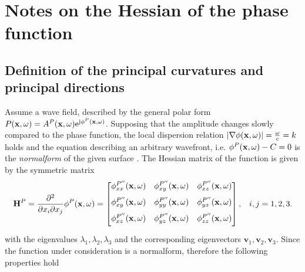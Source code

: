 \section{Notes on the Hessian of the phase function}
\label{App:Hessian}

\subsection{Definition of the principal curvatures and principal directions}
Assume a wave field, described by the general polar form $P(\mathbf{x},\omega) = A^P(\mathbf{x},\omega)\mathrm{e}^{\mathrm{j} \phi^P (\mathbf{x},\omega)}$.
Supposing that the amplitude changes slowly compared to the phase function, the local dispersion relation $| \nabla \phi(\mathbf{x},\omega) |= \frac{\omega}{c} = k$ holds and the equation describing an arbitrary wavefront, i.e. $\phi^P(\mathbf{x},\omega) - C = 0$ is the \emph{normalform} of the given surface \cite{Hartmann1999, Hartmann2001}.
The Hessian matrix of the function is given by the symmetric matrix
\begin{equation}
\mathbf{H}^P =
\frac{\partial^2}{\partial x_i \partial x_j} \phi^P(\mathbf{x},\omega) 
=
 \begin{bmatrix} 
\phi^{P''}_{xx}(\mathbf{x},\omega) & \phi^{P''}_{xy}(\mathbf{x},\omega) & \phi^{P''}_{xz}(\mathbf{x},\omega) \\[.7em]
\phi^{P''}_{xy}(\mathbf{x},\omega) & \phi^{P''}_{yy}(\mathbf{x},\omega) & \phi^{P''}_{yz}(\mathbf{x},\omega) \\[.7em]
\phi^{P''}_{xz}(\mathbf{x},\omega) & \phi^{P''}_{yz}(\mathbf{x},\omega) & \phi^{P''}_{zz}(\mathbf{x},\omega) \\[0.5em]    \end{bmatrix}, \hspace{3mm} i,j = 1,2,3.
\end{equation}
with the eigenvalues $\lambda_1, \lambda_2, \lambda_3$ and the corresponding eigenvectors $\mathbf{v}_1, \mathbf{v}_2, \mathbf{v}_3$.
Since the function under consideration is a normalform, therefore the following properties hold
